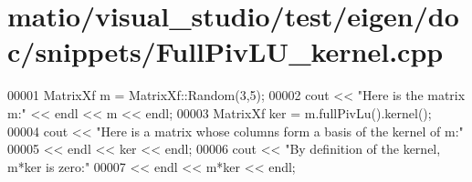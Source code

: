 \hypertarget{matio_2visual__studio_2test_2eigen_2doc_2snippets_2_full_piv_l_u__kernel_8cpp_source}{}\section{matio/visual\+\_\+studio/test/eigen/doc/snippets/\+Full\+Piv\+L\+U\+\_\+kernel.cpp}
\label{matio_2visual__studio_2test_2eigen_2doc_2snippets_2_full_piv_l_u__kernel_8cpp_source}

\begin{DoxyCode}
00001 MatrixXf m = MatrixXf::Random(3,5);
00002 cout << \textcolor{stringliteral}{"Here is the matrix m:"} << endl << m << endl;
00003 MatrixXf ker = m.fullPivLu().kernel();
00004 cout << \textcolor{stringliteral}{"Here is a matrix whose columns form a basis of the kernel of m:"}
00005      << endl << ker << endl;
00006 cout << \textcolor{stringliteral}{"By definition of the kernel, m*ker is zero:"}
00007      << endl << m*ker << endl;
\end{DoxyCode}
